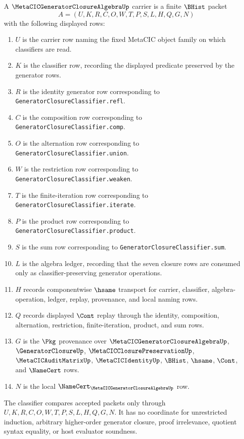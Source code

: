 \begin{definition}
\label{def:metacic-generator-closure-algebra-carrier}
A $\MetaCICGeneratorClosureAlgebraUp$ carrier is a finite $\BHist$ packet
$$
A=(U,K,R,C,O,W,T,P,S,L,H,Q,G,N)
$$
with the following displayed rows:
\begin{enumerate}
\item $U$ is the carrier row naming the fixed MetaCIC object family on which classifiers are read.
\item $K$ is the classifier row, recording the displayed predicate preserved by the generator rows.
\item $R$ is the identity generator row corresponding to \texttt{GeneratorClosureClassifier.refl}.
\item $C$ is the composition row corresponding to \texttt{GeneratorClosureClassifier.comp}.
\item $O$ is the alternation row corresponding to \texttt{GeneratorClosureClassifier.union}.
\item $W$ is the restriction row corresponding to \texttt{GeneratorClosureClassifier.weaken}.
\item $T$ is the finite-iteration row corresponding to \texttt{GeneratorClosureClassifier.iterate}.
\item $P$ is the product row corresponding to \texttt{GeneratorClosureClassifier.product}.
\item $S$ is the sum row corresponding to \texttt{GeneratorClosureClassifier.sum}.
\item $L$ is the algebra ledger, recording that the seven closure rows are consumed only as classifier-preserving generator operations.
\item $H$ records componentwise $\hsame$ transport for carrier, classifier, algebra-operation, ledger, replay, provenance, and local naming rows.
\item $Q$ records displayed $\Cont$ replay through the identity, composition, alternation, restriction, finite-iteration, product, and sum rows.
\item $G$ is the $\Pkg$ provenance over $\MetaCICGeneratorClosureAlgebraUp$, $\GeneratorClosureUp$, $\MetaCICClosurePreservationUp$, $\MetaCICAuditMatrixUp$, $\MetaCICIdentityUp$, $\BHist$, $\hsame$, $\Cont$, and $\NameCert$ rows.
\item $N$ is the local $\NameCert_{\MetaCICGeneratorClosureAlgebraUp}$ row.
\end{enumerate}
The classifier compares accepted packets only through $U,K,R,C,O,W,T,P,S,L,H,Q,G,N$. It has no coordinate for unrestricted induction, arbitrary higher-order generator closure, proof irrelevance, quotient syntax equality, or host evaluator soundness.
\end{definition}

